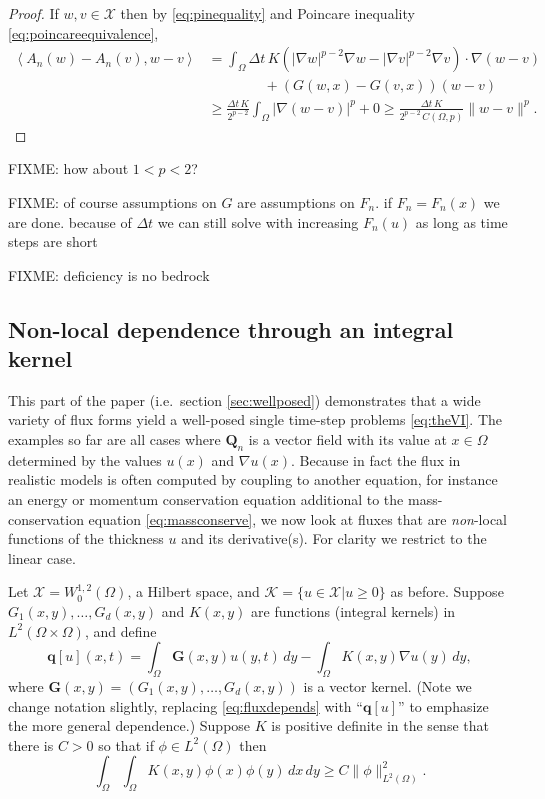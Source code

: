 \documentclass[final,leqno,onefignum,onetabnum]{siamltex1213bueler}
\newcommand\bG{\mathbf{G}}
\newcommand\bq{\mathbf{q}}
\newcommand\bQ{\mathbf{Q}}
\renewcommand{\grad}{\nabla}
\newcommand{\ip}[2]{\ensuremath{\left<#1,#2\right>}}
\begin{document}
\begin{proof}
If $w,v\in\mathcal{X}$ then by \eqref{eq:pinequality} and Poincare inequality \eqref{eq:poincareequivalence},
\begin{align*}
\ip{A_n(w)-A_n(v)}{w-v} &= \int_\Omega \Delta t\, K \left(|\grad w|^{p-2} \grad w - |\grad v|^{p-2} \grad v\right) \cdot \grad (w-v) \\
  &\qquad\qquad + \left(G(w,x) - G(v,x)\right) (w-v) \\
  &\ge \frac{\Delta t\,K}{2^{p-2}} \int_\Omega |\grad (w-v)|^p + 0 \ge \frac{\Delta t\,K}{2^{p-2}\, C(\Omega,p)} \|w-v\|^p.
\end{align*}
\end{proof}

FIXME: how about $1<p<2$?

FIXME: of course assumptions on $G$ are assumptions on $F_n$.  if $F_n=F_n(x)$ we are done. because of $\Delta t$ we can still solve with increasing $F_n(u)$ as long as time steps are short

FIXME: deficiency is no bedrock


\subsection{Non-local dependence through an integral kernel} \label{subsec:nonlocal}   This part of the paper (i.e.~section \ref{sec:wellposed}) demonstrates that a wide variety of flux forms yield a well-posed single time-step problems \eqref{eq:theVI}.  The examples so far are all cases where $\bQ_n$ is a vector field with its value at $x\in\Omega$ determined by the values $u(x)$ and $\grad u(x)$.  Because in fact the flux in realistic models is often computed by coupling to another equation, for instance an energy or momentum conservation equation additional to the mass-conservation equation \eqref{eq:massconserve}, we now look at fluxes that are \emph{non}-local functions of the thickness $u$ and its derivative(s).  For clarity we restrict to the linear case.

Let $\mathcal{X} = W_0^{1,2}(\Omega)$, a Hilbert space, and $\mathcal{K}=\{u\in\mathcal{X}|u\ge 0\}$ as before.  Suppose $G_1(x,y), \dots, G_d(x,y)$ and $K(x,y)$ are functions (integral kernels) in $L^2(\Omega\times \Omega)$, and define
\begin{equation}
\bq[u](x,t) = \int_\Omega \bG(x,y) u(y,t)\,dy - \int_\Omega K(x,y) \grad u(y)\,dy, \label{eq:nonlocaldefnq}
\end{equation}
where $\bG(x,y) = (G_1(x,y), \dots, G_d(x,y))$ is a vector kernel.  (Note we change notation slightly, replacing \eqref{eq:fluxdepends} with ``$\bq[u]$'' to emphasize the more general dependence.)  Suppose $K$ is positive definite in the sense that there is $C>0$ so that if $\phi \in L^2(\Omega)$ then
\begin{equation}
   \int_\Omega \int_\Omega K(x,y) \phi(x) \phi(y)\,dx\,dy \ge C \|\phi\|_{L^2(\Omega)}^2.  \label{eq:nonlocalKpos}
\end{equation}
\end{document}
